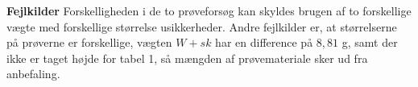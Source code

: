 \textbf{Fejlkilder}
\newline
Forskelligheden i de to prøveforsøg kan skyldes brugen af to forskellige vægte med forskellige størrelse usikkerheder. Andre fejlkilder er, at størrelserne på prøverne er forskellige, vægten $W+sk$ har en difference på $8,\!81$ g, samt der ikke er taget højde for tabel 1, så mængden af prøvemateriale sker ud fra anbefaling.